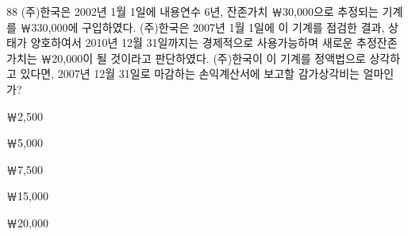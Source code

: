 \begin{question}{88}
(주)한국은 2002년 1월 1일에 내용연수 6년, 잔존가치 ￦30,000으로 추정되는 기계를 ￦330,000에 구입하였다. (주)한국은 2007년 1월 1일에 이 기계를 점검한 결과, 상태가 양호하여서 2010년 12월 31일까지는 경제적으로 사용가능하며 새로운 추정잔존가치는 ￦20,000이 될 것이라고 판단하였다. (주)한국이 이 기계를 정액법으로 상각하고 있다면, 2007년 12월 31일로 마감하는 손익계산서에 보고할 감가상각비는 얼마인가?
\begin{choices}
  \item ￦2,500
  \item ￦5,000
  \item ￦7,500
  \item ￦15,000
  \item ￦20,000
\end{choices}
\end{question}
